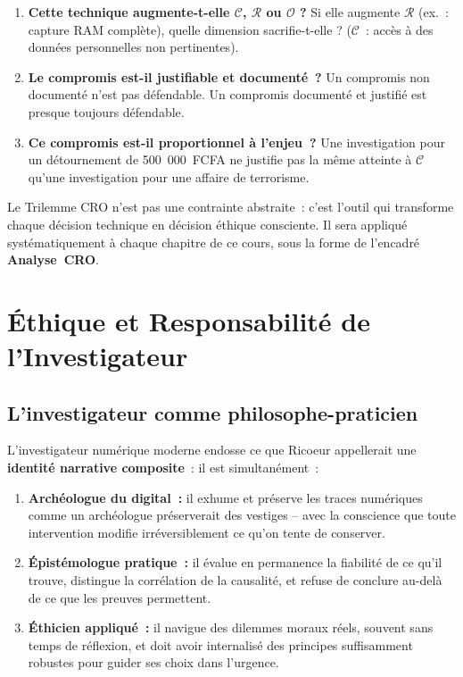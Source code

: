 \begin{enumerate}
    \item \textbf{Cette technique augmente-t-elle $\mathcal{C}$, $\mathcal{R}$
          ou $\mathcal{O}$ ?} Si elle augmente $\mathcal{R}$ (ex.~: capture
          RAM complète), quelle dimension sacrifie-t-elle ?
          ($\mathcal{C}$~: accès à des données personnelles non pertinentes).

    \item \textbf{Le compromis est-il justifiable et documenté~?} Un
          compromis non documenté n'est pas défendable. Un compromis documenté
          et justifié est presque toujours défendable.

    \item \textbf{Ce compromis est-il proportionnel à l'enjeu~?} Une
          investigation pour un détournement de 500~000~FCFA ne justifie
          pas la même atteinte à $\mathcal{C}$ qu'une investigation pour
          une affaire de terrorisme.
\end{enumerate}

Le Trilemme CRO n'est pas une contrainte abstraite~: c'est l'outil qui
transforme chaque décision technique en décision éthique consciente. Il
sera appliqué systématiquement à chaque chapitre de ce cours, sous la
forme de l'encadré \textbf{Analyse~CRO}.

\section{Éthique et Responsabilité de l'Investigateur}

\subsection{L'investigateur comme philosophe-praticien}

L'investigateur numérique moderne endosse ce que Ricoeur appellerait
une \textbf{identité narrative composite}~: il est simultanément~:

\begin{enumerate}
    \item \textbf{Archéologue du digital~:} il exhume et préserve les traces
          numériques comme un archéologue préserverait des vestiges -- avec
          la conscience que toute intervention modifie irréversiblement ce
          qu'on tente de conserver.

    \item \textbf{Épistémologue pratique~:} il évalue en permanence la
          fiabilité de ce qu'il trouve, distingue la corrélation de la
          causalité, et refuse de conclure au-delà de ce que les preuves
          permettent.

    \item \textbf{Éthicien appliqué~:} il navigue des dilemmes moraux réels,
          souvent sans temps de réflexion, et doit avoir internalisé des
          principes suffisamment robustes pour guider ses choix dans l'urgence.
\end{enumerate}

